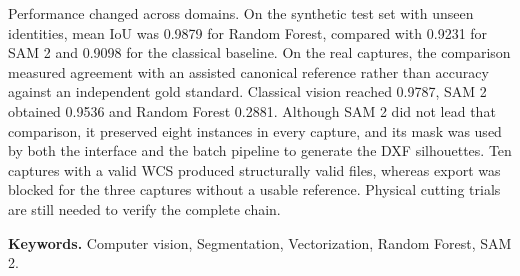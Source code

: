 \documentclass[11pt,a4paper,spanish]{book}
\numberwithin{equation}{chapter}
\begin{document}
Performance changed across domains. On the synthetic test set with unseen identities, mean IoU was 0.9879 for Random Forest, compared with 0.9231 for SAM 2 and 0.9098 for the classical baseline. On the real captures, the comparison measured agreement with an assisted canonical reference rather than accuracy against an independent gold standard. Classical vision reached 0.9787, SAM 2 obtained 0.9536 and Random Forest 0.2881. Although SAM 2 did not lead that comparison, it preserved eight instances in every capture, and its mask was used by both the interface and the batch pipeline to generate the DXF silhouettes. Ten captures with a valid WCS produced structurally valid files, whereas export was blocked for the three captures without a usable reference. Physical cutting trials are still needed to verify the complete chain.

\textbf{Keywords.} Computer vision, Segmentation, Vectorization, Random Forest, SAM 2.

\mainmatter










\appendix
\renewcommand{\appendixname}{ANEXO}


\begingroup
\small


\endgroup
\end{document}
